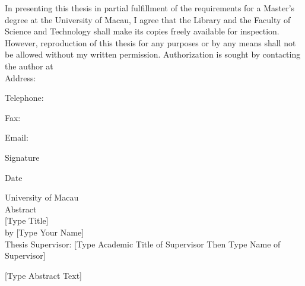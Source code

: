 \begin{titlepage}
\newpage
\thispagestyle{umempty}
\vspace*{4\baselineskip}
{ In presenting this thesis in partial fulfillment of the requirements for a Master's degree at the University of Macau, I agree that the Library and the Faculty of Science and Technology shall make its copies freely available for inspection. However, reproduction of this thesis for any purposes or by any means shall not be allowed without my written permission.
Authorization is sought by contacting the author at}\\[2\baselineskip]
\mbox{\qquad} Address:\par
\mbox{\qquad} Telephone:\par
\mbox{\qquad} Fax:\par
\mbox{\qquad} Email: \par
\mbox{\hspace{24em}}Signature \par
\mbox{\hspace{24em}} Date


\newpage
\thispagestyle{umempty}
\begin{center}
\vspace*{5\baselineskip}
\textit{}
\end{center}

\newpage
\thispagestyle{umempty}
\vspace*{1\baselineskip}
\begin{center}
{\large University of Macau \\ [1\baselineskip]
Abstract} \\ [2\baselineskip]
[Type Title] \\ [1\baselineskip]
by [Type Your Name] \\ [1\baselineskip]
Thesis Supervisor: [Type Academic Title of Supervisor Then Type Name of Supervisor]
\end{center}
[Type Abstract Text]

\afterpage{\thispagestyle{umempty}\null\newpage}
\end{titlepage}
